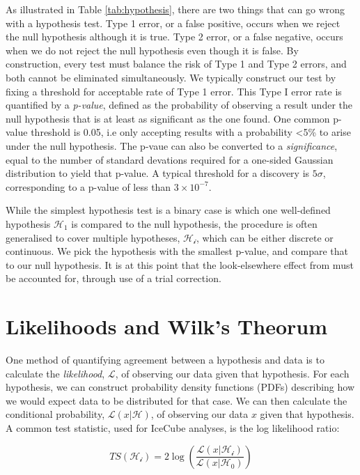 As illustrated in Table \ref{tab:hypothesis}, there are two things that can go wrong with a hypothesis test. Type 1 error, or a false positive, occurs when we reject the null hypothesis although it is true. Type 2 error, or a false negative, occurs when we do not reject the null hypothesis even though it is false. By construction, every test must balance the risk of Type 1 and Type 2 errors, and both cannot be eliminated simultaneously. We typically construct our test by fixing a threshold for acceptable rate of Type 1 error. This Type I error rate is quantified by a \emph{p-value}, defined as the probability of observing a result under the null hypothesis that is at least as significant as the one found. One common p-value threshold is 0.05, i.e only accepting results with a probability <5\% to arise under the null hypothesis. The p-vaue can also be converted to a \emph{significance}, equal to the number of standard devations required for a one-sided Gaussian distribution to yield that p-value. A typical threshold for a discovery is $5 \sigma$, corresponding to a p-value of less than $3 \times 10^{-7}$.

While the simplest hypothesis test is a binary case is which one well-defined hypothesis $\mathcal{H_{1}}$ is compared to the null hypothesis, the procedure is often generalised to cover multiple hypotheses, $\mathcal{H_{i}}$, which can be either discrete or continuous. We pick the hypothesis with the smallest p-value, and compare that to our null hypothesis. It is at this point that the look-elsewhere effect from must be accounted for, through use of a trial correction. 

\section{Likelihoods and Wilk's Theorum}

One method of quantifying agreement between a hypothesis and data is to calculate the \emph{likelihood}, $\mathcal{L}$, of observing our data given that hypothesis. For each hypothesis, we can construct probability density functions (PDFs) describing how we would expect data to be distributed for that case. We can then calculate the conditional probability, $\mathcal{L}(x | \mathcal{H})$, of observing our data $x$ given that hypothesis. A common test statistic, used for IceCube analyses, is the log likelihood ratio:

\begin{equation}
TS (\mathcal{H_{i}}) = 2 \log \left( \frac{\mathcal{L}(x | \mathcal{H_{i}})}{\mathcal{L}(x | \mathcal{H_{0}})} \right)
\end{equation}

